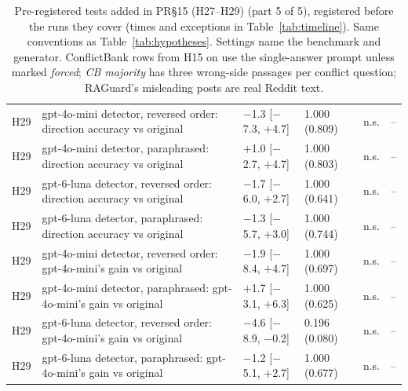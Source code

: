 \begin{table}[p]
{\begin{tabular}{lp{6.6cm}llll}
H29 & gpt-4o-mini detector, reversed order: direction accuracy vs original & $-$1.3 [$-$7.3, $+$4.7] & 1.000 (0.809) & n.s. & -- \\
H29 & gpt-4o-mini detector, paraphrased: direction accuracy vs original & $+$1.0 [$-$2.7, $+$4.7] & 1.000 (0.803) & n.s. & -- \\
H29 & gpt-6-luna detector, reversed order: direction accuracy vs original & $-$1.7 [$-$6.0, $+$2.7] & 1.000 (0.641) & n.s. & -- \\
H29 & gpt-6-luna detector, paraphrased: direction accuracy vs original & $-$1.3 [$-$5.7, $+$3.0] & 1.000 (0.744) & n.s. & -- \\
H29 & gpt-4o-mini detector, reversed order: gpt-4o-mini's gain vs original & $-$1.9 [$-$8.4, $+$4.7] & 1.000 (0.697) & n.s. & -- \\
H29 & gpt-4o-mini detector, paraphrased: gpt-4o-mini's gain vs original & $+$1.7 [$-$3.1, $+$6.3] & 1.000 (0.625) & n.s. & -- \\
H29 & gpt-6-luna detector, reversed order: gpt-4o-mini's gain vs original & $-$4.6 [$-$8.9, $-$0.2] & 0.196 (0.080) & n.s. & -- \\
H29 & gpt-6-luna detector, paraphrased: gpt-4o-mini's gain vs original & $-$1.2 [$-$5.1, $+$2.7] & 1.000 (0.677) & n.s. & -- \\
\bottomrule
\end{tabular}}
\caption{Pre-registered tests added in PR\S15 (H27--H29) (part 5 of 5), registered before the runs they cover (times and exceptions in
Table~\ref{tab:timeline}). Same conventions as
Table~\ref{tab:hypotheses}. Settings name the benchmark and generator. ConflictBank rows from H15 on use the
single-answer prompt unless marked \emph{forced}; \emph{CB majority} has three wrong-side passages per conflict
question; RAGuard's misleading posts are real Reddit text.}
\label{tab:hypotheses15}
\end{table}

